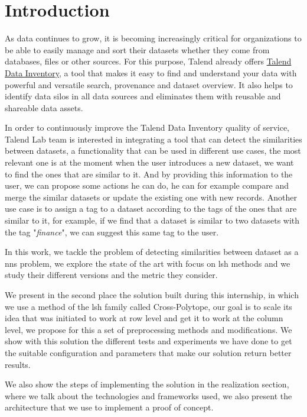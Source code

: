 \chapter*{Introduction}

As data continues to grow, it is becoming increasingly critical for
organizations to be able to easily manage and sort their datasets whether they
come from databases, files or other sources. For this purpose, Talend already
offers \href{https://www.talend.com/products/data-inventory/}{Talend Data
Inventory}, a tool that makes it easy to find and understand your data with
powerful and versatile search, provenance and dataset overview. It also helps to
identify data silos in all data sources and eliminates them with reusable and
shareable data assets.

In order to continuously improve the Talend Data Inventory quality of service,  
Talend Lab team is interested in integrating a tool that can detect the
similarities between datasets, a functionality that can be used in different use
cases, the most relevant one is at the moment when the user introduces a new
dataset, we want to find the ones that are similar to it. And by providing this
information to the user, we can propose some actions he can do, he can for
example compare and merge the similar datasets or update the existing one with
new records. Another use case is to assign a tag to a dataset according to the
tags of the ones that are similar to it, for example, if we find that a dataset
is similar to two datasets with the tag "\textit{finance}", we can suggest this
same tag to the user.

In this work, we tackle the problem of detecting similarities between dataset as
a \Acrfull{nns} problem, we explore the state of the art with focus on
\Acrfull{lsh} methods and we study their different versions and the metric they
consider.

We present in the second place the solution built during this internship, in
which we use a method of the \acrshort{lsh} family called Cross-Polytope, our
goal is to scale its idea that was initiated to work at row level and get it to
work at the column level, we propose for this a set of preprocessing methods and
modifications. We show with this solution the different tests and experiments we
have done to get the suitable configuration and parameters that make our
solution return better results.

We also show the steps of implementing the solution in the realization section,
where we talk about the technologies and frameworks used, we also present the
architecture that we use to implement a proof of concept.

